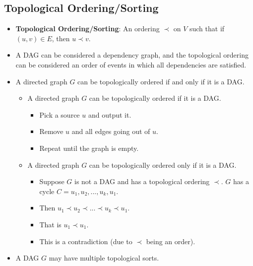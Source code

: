 \subsection{Topological Ordering/Sorting}
\begin{itemize}
    \item \textbf{Topological Ordering/Sorting}: An ordering $\prec$ on $V$ such that if $(u, v) \in E$, then $u \prec v$.
    \item A DAG can be considered a dependency graph, and the topological ordering can be considered an order of events in which all dependencies are satisfied.
    \item A directed graph $G$ can be topologically ordered if and only if it is a DAG.
    \begin{itemize}
        \item A directed graph $G$ can be topologically ordered if it is a DAG.
        \begin{itemize}
            \item Pick a source $u$ and output it.
            \item Remove $u$ and all edges going out of $u$.
            \item Repeat until the graph is empty.
        \end{itemize}
        \item A directed graph $G$ can be topologically ordered only if it is a DAG.
        \begin{itemize}
            \item Suppose $G$ is not a DAG and has a topological ordering $\prec$. $G$ has a cycle $C = u_1, u_2, ..., u_k, u_1$.
            \item Then $u_1 \prec u_2 \prec ... \prec u_k \prec u_1$.
            \item That is $u_1 \prec u_1$.
            \item This is a contradiction (due to $\prec$ being an order).
        \end{itemize}
    \end{itemize}
    \item A DAG $G$ may have multiple topological sorts.
\end{itemize}
